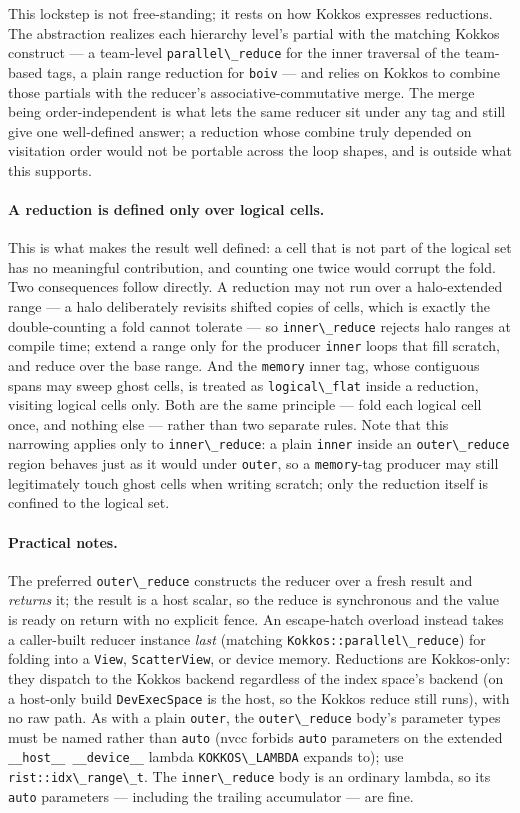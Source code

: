 \documentclass[11pt]{article}
\newcommand{\code}[1]{\lstinline[basicstyle=\ttfamily]|#1|}
\begin{document}
This lockstep is not free-standing; it rests on how Kokkos expresses reductions. The
abstraction realizes each hierarchy level's partial with the matching Kokkos
construct --- a team-level \code{parallel\_reduce} for the inner traversal of the
team-based tags, a plain range reduction for \code{boiv} --- and relies on Kokkos to
combine those partials with the reducer's associative-commutative merge. The merge
being order-independent is what lets the same reducer sit under any tag and still give
one well-defined answer; a reduction whose combine truly depended on visitation order
would not be portable across the loop shapes, and is outside what this supports.

\paragraph{A reduction is defined only over logical cells.} This is what makes the
result well defined: a cell that is not part of the logical set has no meaningful
contribution, and counting one twice would corrupt the fold. Two consequences follow
directly. A reduction may not run over a halo-extended range --- a halo deliberately
revisits shifted copies of cells, which is exactly the double-counting a fold cannot
tolerate --- so \code{inner\_reduce} rejects halo ranges at compile time; extend a
range only for the producer \code{inner} loops that fill scratch, and reduce over the
base range. And the \code{memory} inner tag, whose contiguous spans may sweep ghost
cells, is treated as \code{logical\_flat} inside a reduction, visiting logical cells
only. Both are the same principle --- fold each logical cell once, and nothing else ---
rather than two separate rules. Note that this narrowing applies only to
\code{inner\_reduce}: a plain \code{inner} inside an \code{outer\_reduce} region
behaves just as it would under \code{outer}, so a \code{memory}-tag producer may still
legitimately touch ghost cells when writing scratch; only the reduction itself is
confined to the logical set.

\paragraph{Practical notes.} The preferred \code{outer\_reduce} constructs the reducer
over a fresh result and \emph{returns} it; the result is a host scalar, so the reduce
is synchronous and the value is ready on return with no explicit fence. An
escape-hatch overload instead takes a caller-built reducer instance \emph{last}
(matching \code{Kokkos::parallel\_reduce}) for folding into a \code{View},
\code{ScatterView}, or device memory. Reductions are Kokkos-only: they dispatch to the
Kokkos backend regardless of the index space's backend (on a host-only build
\code{DevExecSpace} is the host, so the Kokkos reduce still runs), with no raw path. As
with a plain \code{outer}, the \code{outer\_reduce} body's parameter types must be
named rather than \code{auto} (nvcc forbids \code{auto} parameters on the extended
\verb|__host__ __device__| lambda \code{KOKKOS\_LAMBDA} expands to); use
\code{rist::idx\_range\_t}. The \code{inner\_reduce} body is an ordinary lambda, so its
\code{auto} parameters --- including the trailing accumulator --- are fine.
\end{document}
